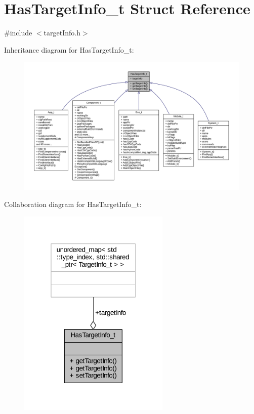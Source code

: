 \hypertarget{struct_has_target_info__t}{}\section{Has\+Target\+Info\+\_\+t Struct Reference}
\label{struct_has_target_info__t}


{\ttfamily \#include $<$target\+Info.\+h$>$}



Inheritance diagram for Has\+Target\+Info\+\_\+t\+:
\nopagebreak
\begin{figure}[H]
\begin{center}
\leavevmode
\includegraphics[width=350pt]{struct_has_target_info__t__inherit__graph}
\end{center}
\end{figure}


Collaboration diagram for Has\+Target\+Info\+\_\+t\+:
\nopagebreak
\begin{figure}[H]
\begin{center}
\leavevmode
\includegraphics[width=205pt]{struct_has_target_info__t__coll__graph}
\end{center}
\end{figure}
